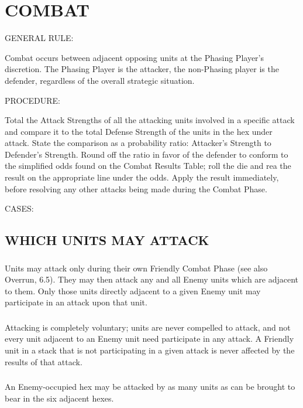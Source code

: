 \section{COMBAT}

GENERAL RULE:

Combat occurs between adjacent opposing units at the Phasing Player's discretion. The Phasing Player is the attacker, the non-Phasing player is the defender, regardless of the overall strategic situation.

PROCEDURE:

Total the Attack Strengths of all the attacking units involved in a specific attack and compare it to the total Defense Strength of the units in the hex under attack. State the comparison as a probability ratio: Attacker's Strength to Defender's Strength. Round off the ratio in favor of the defender to conform to the simplified odds found on the Combat Results Table; roll the die and rea the result on the appropriate line under the odds. Apply the result immediately, before resolving any other attacks being made during the Combat Phase.

CASES:

\subsection{WHICH UNITS MAY ATTACK}

\subsubsection{} Units may attack only during their own Friendly Combat Phase (see also Overrun, 6.5). They may then attack any and all Enemy units which are adjacent to them. Only those units directly adjacent to a given Enemy unit may participate in an attack upon that unit.

\subsubsection{} Attacking is completely voluntary; units are never compelled to attack, and not every unit adjacent to an Enemy unit need participate in any attack. A Friendly unit in a stack that is not participating in a given attack is never affected by the results of that attack.

\subsubsection{} An Enemy-occupied hex may be attacked by as many units as can be brought to bear in the six adjacent hexes.

